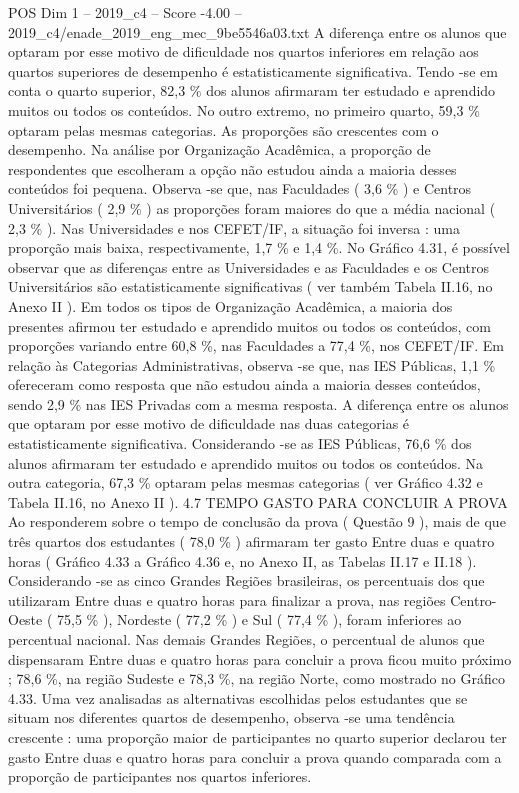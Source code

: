 \begin{textsample}{POS Dim 1 – 2019\_c4 – Score -4.00 – 2019\_c4/enade\_2019\_eng\_mec\_9be5546a03.txt}
A diferença entre os alunos que optaram por esse motivo de dificuldade nos quartos inferiores em relação aos quartos superiores de desempenho é estatisticamente significativa.
Tendo -se em conta o quarto superior, 82,3 \% dos alunos afirmaram ter estudado e aprendido muitos ou todos os conteúdos.
No outro extremo, no primeiro quarto, 59,3 \% optaram pelas mesmas categorias.
As proporções são crescentes com o desempenho.
Na análise por Organização Acadêmica, a proporção de respondentes que escolheram a opção não estudou ainda a maioria desses conteúdos foi pequena.
Observa -se que, nas Faculdades ( 3,6 \% ) e Centros Universitários ( 2,9 \% ) as proporções foram maiores do que a média nacional ( 2,3 \% ).
Nas Universidades e nos CEFET/IF, a situação foi inversa : uma proporção mais baixa, respectivamente, 1,7 \% e 1,4 \%.
No Gráfico 4.31, é possível observar que as diferenças entre as Universidades e as Faculdades e os Centros Universitários são estatisticamente significativas ( ver também Tabela II.16, no Anexo II ).
Em todos os tipos de Organização Acadêmica, a maioria dos presentes afirmou ter estudado e aprendido muitos ou todos os conteúdos, com proporções variando entre 60,8 \%, nas Faculdades a 77,4 \%, nos CEFET/IF.
Em relação às Categorias Administrativas, observa -se que, nas IES Públicas, 1,1 \% ofereceram como resposta que não estudou ainda a maioria desses conteúdos, sendo 2,9 \% nas IES Privadas com a mesma resposta.
A diferença entre os alunos que optaram por esse motivo de dificuldade nas duas categorias é estatisticamente significativa.
Considerando -se as IES Públicas, 76,6 \% dos alunos afirmaram ter estudado e aprendido muitos ou todos os conteúdos.
Na outra categoria, 67,3 \% optaram pelas mesmas categorias ( ver Gráfico 4.32 e Tabela II.16, no Anexo II ). 4.7 TEMPO GASTO PARA CONCLUIR A PROVA Ao responderem sobre o tempo de conclusão da prova ( Questão 9 ), mais de que três quartos dos estudantes ( 78,0 \% ) afirmaram ter gasto Entre duas e quatro horas ( Gráfico 4.33 a Gráfico 4.36 e, no Anexo II, as Tabelas II.17 e II.18 ).
Considerando -se as cinco Grandes Regiões brasileiras, os percentuais dos que utilizaram Entre duas e quatro horas para finalizar a prova, nas regiões Centro-Oeste ( 75,5 \% ), Nordeste ( 77,2 \% ) e Sul ( 77,4 \% ), foram inferiores ao percentual nacional.
Nas demais Grandes Regiões, o percentual de alunos que dispensaram Entre duas e quatro horas para concluir a prova ficou muito próximo ; 78,6 \%, na região Sudeste e 78,3 \%, na região Norte, como mostrado no Gráfico 4.33.
Uma vez analisadas as alternativas escolhidas pelos estudantes que se situam nos diferentes quartos de desempenho, observa -se uma tendência crescente : uma proporção maior de participantes no quarto superior declarou ter gasto Entre duas e quatro horas para concluir a prova quando comparada com a proporção de participantes nos quartos inferiores.

\end{textsample}
